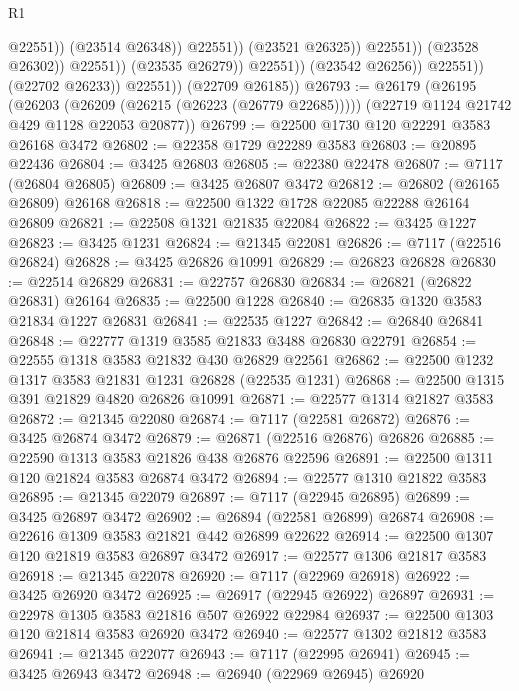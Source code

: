 \begin{lexlean}{R1}
\begin{coremodule}
                                              @22551))
                                          (@23514 @26348))
                                        @22551))
                                    (@23521 @26325))
                                  @22551))
                              (@23528 @26302))
                            @22551))
                        (@23535 @26279))
                      @22551))
                  (@23542 @26256))
                @22551))
            (@22702 @26233))
          @22551))
      (@22709 @26185))
@26793 := @26179
    (@26195
      (@26203 (@26209 (@26215 (@26223 (@26779 @22685)))))
      (@22719 @1124 @21742 @429 @1128 @22053 @20877))
@26799 := @22500 @1730 @120 @22291 @3583 @26168 @3472
@26802 := @22358 @1729 @22289 @3583
@26803 := @20895 @22436
@26804 := @3425 @26803
@26805 := @22380 @22478
@26807 := @7117 (@26804 @26805)
@26809 := @3425 @26807 @3472
@26812 := @26802 (@26165 @26809) @26168
@26818 := @22500 @1322 @1728 @22085 @22288 @26164 @26809
@26821 := @22508 @1321 @21835 @22084
@26822 := @3425 @1227
@26823 := @3425 @1231
@26824 := @21345 @22081
@26826 := @7117 (@22516 @26824)
@26828 := @3425 @26826 @10991
@26829 := @26823 @26828
@26830 := @22514 @26829
@26831 := @22757 @26830
@26834 := @26821 (@26822 @26831) @26164
@26835 := @22500 @1228
@26840 := @26835 @1320 @3583 @21834 @1227 @26831
@26841 := @22535 @1227
@26842 := @26840 @26841
@26848 := @22777 @1319 @3585 @21833 @3488 @26830 @22791
@26854 := @22555 @1318 @3583 @21832 @430 @26829 @22561
@26862 := @22500 @1232 @1317 @3583 @21831 @1231 @26828 (@22535 @1231)
@26868 := @22500 @1315 @391 @21829 @4820 @26826 @10991
@26871 := @22577 @1314 @21827 @3583
@26872 := @21345 @22080
@26874 := @7117 (@22581 @26872)
@26876 := @3425 @26874 @3472
@26879 := @26871 (@22516 @26876) @26826
@26885 := @22590 @1313 @3583 @21826 @438 @26876 @22596
@26891 := @22500 @1311 @120 @21824 @3583 @26874 @3472
@26894 := @22577 @1310 @21822 @3583
@26895 := @21345 @22079
@26897 := @7117 (@22945 @26895)
@26899 := @3425 @26897 @3472
@26902 := @26894 (@22581 @26899) @26874
@26908 := @22616 @1309 @3583 @21821 @442 @26899 @22622
@26914 := @22500 @1307 @120 @21819 @3583 @26897 @3472
@26917 := @22577 @1306 @21817 @3583
@26918 := @21345 @22078
@26920 := @7117 (@22969 @26918)
@26922 := @3425 @26920 @3472
@26925 := @26917 (@22945 @26922) @26897
@26931 := @22978 @1305 @3583 @21816 @507 @26922 @22984
@26937 := @22500 @1303 @120 @21814 @3583 @26920 @3472
@26940 := @22577 @1302 @21812 @3583
@26941 := @21345 @22077
@26943 := @7117 (@22995 @26941)
@26945 := @3425 @26943 @3472
@26948 := @26940 (@22969 @26945) @26920

\end{coremodule}
\end{lexlean}

